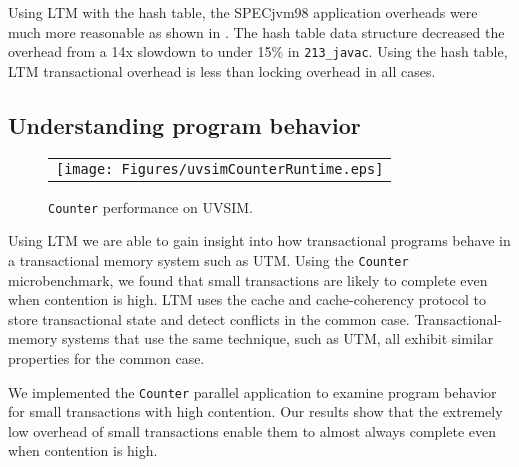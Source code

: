 Using LTM with the hash table, the SPECjvm98 application overheads
were much more reasonable as shown in .  The hash
table data structure decreased the overhead from a 14x slowdown to
under 15\% in \texttt{213\_javac}. Using the hash table, LTM
transactional overhead is less than locking overhead in all cases.


\subsection{Understanding program behavior}

\begin{figure}
\begin{center}
\begin{tabular}{c}
\texttt{[image: Figures/uvsimCounterRuntime.eps]}
\end{tabular}
\end{center}
\caption{\texttt{Counter} performance on UVSIM.}
\label{fig:microbenchperf}
\end{figure}

Using LTM we are able to gain insight into how transactional programs
behave in a transactional memory system such as UTM. Using the
\texttt{Counter} microbenchmark, we found that small transactions are
likely to complete even when contention is high. LTM uses the
cache and cache-coherency protocol to store transactional state and
detect conflicts in the common case. Transactional-memory systems that
use the same technique, such as UTM, all exhibit similar
properties for the common case.

We implemented the \texttt{Counter} parallel application to examine
program behavior for small transactions with high contention. Our
results show that the extremely low overhead of small transactions
enable them to almost always complete even when contention is high.

